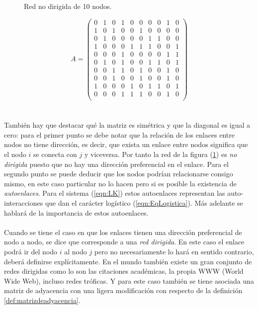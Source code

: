 \begin{figure} \vspace{-30pt} \begin{center}
		 
	\end{center} 
	\vspace{-20pt} 
	\caption{Red no dirigida de 10 nodos.} 
	\vspace{-150pt}
	\label{fig:Red10}
\end{figure} 

$$
A=\begin{pmatrix}
	0 & 1 & 0 & 1 & 0 & 0 & 0 & 0 & 1 & 0 \\
	1 & 0 & 1 & 0 & 0 & 1 & 0 & 0 & 0 & 0 \\
	0 & 1 & 0 & 0 & 0 & 0 & 1 & 1 & 0 & 0 \\
	1 & 0 & 0 & 0 & 1 & 1 & 1 & 0 & 0 & 1 \\
	0 & 0 & 0 & 1 & 0 & 0 & 0 & 0 & 1 & 1 \\
	0 & 1 & 0 & 1 & 0 & 0 & 1 & 1 & 0 & 1 \\
	0 & 0 & 1 & 1 & 0 & 1 & 0 & 0 & 1 & 0 \\
	0 & 0 & 1 & 0 & 0 & 1 & 0 & 0 & 1 & 0 \\
	1 & 0 & 0 & 0 & 1 & 0 & 1 & 1 & 0 & 1 \\
	0 & 0 & 0 & 1 & 1 & 1 & 0 & 0 & 1 & 0 \\
\end{pmatrix}
$$\\
\\
También hay que destacar qué la matriz es simétrica y que la diagonal es igual a cero: para el primer punto se debe notar que la relación de los enlaces entre nodos no tiene dirección, es decir, que exista un enlace entre nodos significa que el nodo $i$ se conecta con $j$ y viceversa. Por tanto la red de la figura (\ref{fig:Red10}) es \textit{no dirigida} puesto que no hay una dirección preferencial en el enlace. Para el segundo punto se puede deducir que los nodos podrían relacionarse consigo mismo, en este caso particular no lo hacen pero si es posible la existencia de \textit{autoenlaces}. Para el sistema (\ref{eqn:LK}) estos autoenlaces representan las auto-interacciones que dan el carácter logístico (\ref{eqn:EqLogistica}). Más adelante se hablará de la importancia de estos autoenlaces.
\\
\\
Cuando se tiene el caso en que los enlaces tienen una dirección preferencial de nodo a nodo, se dice que corresponde a una \textit{red dirigida}. En este caso el enlace podrá ir del nodo $i$ al nodo $j$ pero no necesariamente lo hará en sentido contrario, deberá definirse explícitamente. En el mundo también existe un gran conjunto de redes dirigidas como lo son las citaciones académicas, la propia WWW (World Wide Web), incluso redes tróficas. Y para este caso también se tiene asociada una matriz de adyacencia con una ligera modificación con respecto de la definición \ref{def:matrizdeadyacencia}.
